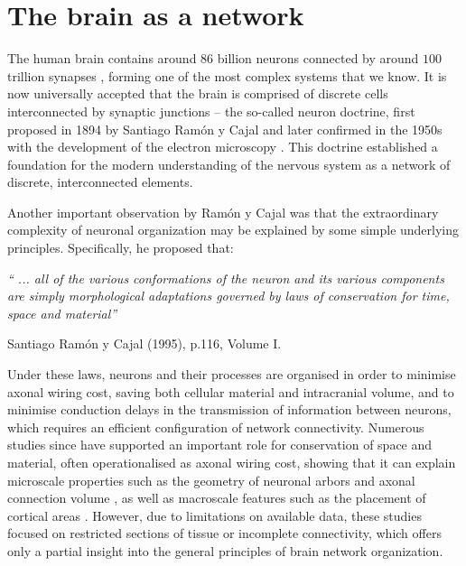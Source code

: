 \section{The brain as a network}
The human brain contains around $86$ billion neurons connected by around $100$ trillion synapses \citep{Williams1988,Andersen1992,Pelvig2008}, forming one of the most complex systems that we know. It is now universally accepted that the brain is comprised of discrete cells interconnected by synaptic junctions -- the so-called neuron doctrine, first proposed in 1894 by Santiago Ram\'{o}n y Cajal \citep{RamonyCajal1995} and later confirmed in the 1950s with the development of the electron microscopy \citep{DeRobertis1955}. This doctrine established a foundation for the modern understanding of the nervous system as a network of discrete, interconnected elements.

Another important observation by Ram\'{o}n y Cajal was that the extraordinary complexity of neuronal organization may be explained by some simple underlying principles. Specifically, he proposed that:
\bigskip
\bigskip

\textit{`` ... all of the various conformations of the neuron and its various components are simply morphological adaptations governed by laws of conservation for time, space and material''}

\hspace{7.5cm}Santiago Ram\'{o}n y Cajal (1995), p.116, Volume I.
\bigskip
\bigskip

Under these laws, neurons and their processes are organised in order to minimise axonal wiring cost, saving both cellular material and intracranial volume, and to minimise conduction delays in the transmission of information between neurons, which requires an efficient configuration of network connectivity. Numerous studies since have supported an important role for conservation of space and material, often operationalised as axonal wiring cost, showing that it can explain microscale properties such as the geometry of neuronal arbors \citep{Cherniak1999} and axonal connection volume \citep{Chklovskii2002}, as well as macroscale features such as the placement of cortical areas \citep{Cherniak2004}. However, due to limitations on available data, these studies focused on restricted sections of tissue or incomplete connectivity, which offers only a partial insight into the general principles of brain network organization.

